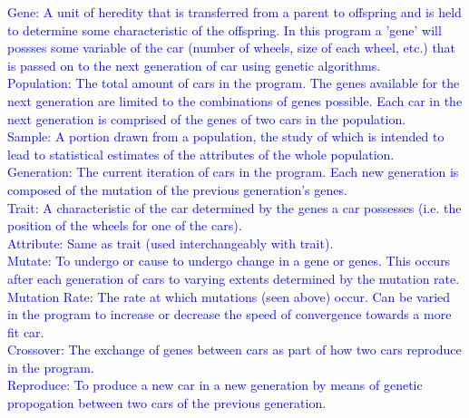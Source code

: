 \documentclass[12pt, titlepage]{article}
\begin{document}
\textcolor{blue}{Gene: A unit of heredity that is transferred from a parent to 
offspring and is 
held to determine some characteristic of the offspring. In this program a 'gene' 
will possses some variable of the car (number of wheels, size of each wheel, 
etc.) that is passed on to the next generation of car using genetic 
algorithms.}\\

\textcolor{blue}{Population: The total amount of cars in the program. The genes 
available for the next generation are limited to the combinations of genes 
possible. Each car in the next generation is comprised of the genes of two cars 
in the population.}\\

\textcolor{blue}{Sample: A portion drawn from a population, the study of which 
is intended to 
lead to statistical estimates of the attributes of the whole population.}\\

\textcolor{blue}{Generation: The current iteration of cars in the program. Each 
new generation is composed of the mutation of the previous generation's 
genes.}\\

\textcolor{blue}{Trait: A characteristic of the car determined by the genes a 
car possesses (i.e. the position of the wheels 
for one of the cars).}\\

\textcolor{blue}{Attribute: Same as trait (used interchangeably with trait).}\\

\textcolor{blue}{Mutate: To undergo or cause to undergo change in a gene or 
genes. This occurs after each generation of cars to varying extents determined 
by the mutation rate.}\\

\textcolor{blue}{Mutation Rate: The rate at which mutations (seen above) occur. 
Can be varied in the program to increase or decrease the speed of convergence 
towards a more fit car.}\\

\textcolor{blue}{Crossover: The exchange of genes between cars as part of how 
two cars reproduce in the program.}\\

\textcolor{blue}{Reproduce: To produce a new car in a new generation by means of 
genetic propogation between two cars of the previous generation.}\\
\end{document}
